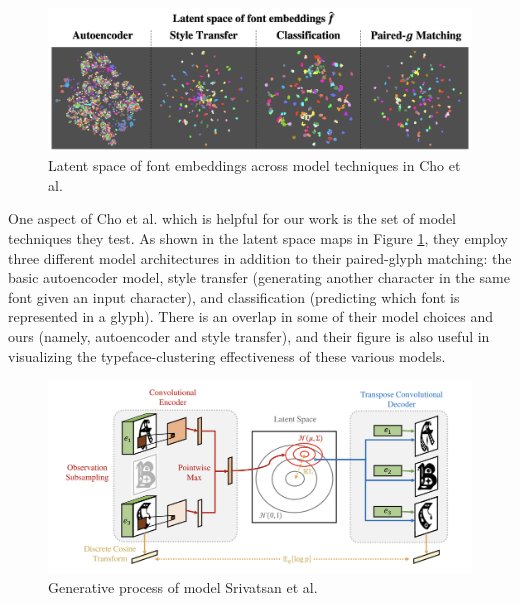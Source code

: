 \begin{figure}[b]
    \centering
    \includegraphics[width=1\textwidth]{images/cho-latent-space.png}
    \caption{Latent space of font embeddings across model techniques in Cho et al.}
    \label{fig:cho-latent-space}
\end{figure}

One aspect of Cho et al. which is helpful for our work is the set of model techniques they test. As shown in the latent space maps in Figure \ref{fig:cho-latent-space}, they employ three different model architectures in addition to their paired-glyph matching: the basic autoencoder model, style transfer (generating another character in the same font given an input character), and classification (predicting which font is represented in a glyph). There is an overlap in some of their model choices and ours (namely, autoencoder and style transfer), and their figure is also useful in visualizing the typeface-clustering effectiveness of these various models.

\begin{figure}[H]
    \centering
    \includegraphics[width=1\textwidth]{images/srivatsan-model.png}
    \caption{Generative process of model Srivatsan et al.}
    \label{fig:srivatsan-model}
\end{figure}

